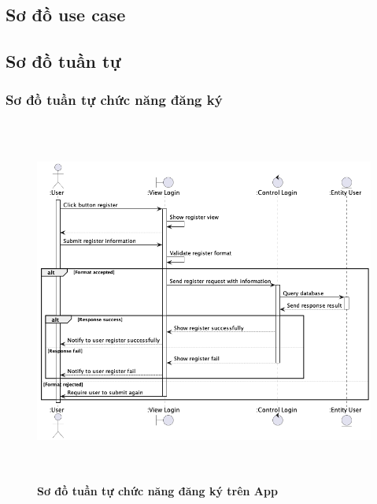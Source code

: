 \documentclass{article}%
\begin{document}
\subsection{Sơ đồ use case}

\subsection{Sơ đồ tuần tự}
\subsubsection{Sơ đồ tuần tự chức năng đăng ký}
    \begin{figure}[H]
         \centering
         \includegraphics[width=16cm,height=12cm]{Images/mobile_app/register.png}
         \caption[Sơ đồ tuần tự chức năng đăng ký trên App]{\bfseries \fontsize{12pt}{0pt}
         \selectfont Sơ đồ tuần tự chức năng đăng ký trên App}
         \label{hinh21} %
    \end{figure}
\end{document}
